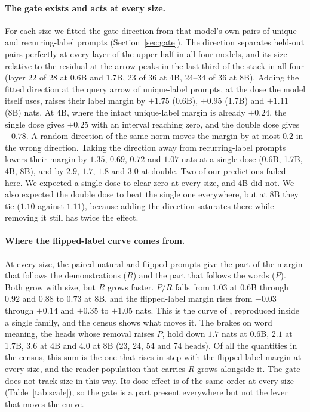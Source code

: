 \documentclass{article}
\begin{document}
\paragraph{The gate exists and acts at every size.} For each size we fitted the gate direction from that model's own pairs of unique- and recurring-label prompts (Section~\ref{sec:gate}). The direction separates held-out pairs perfectly at every layer of the upper half in all four models, and its size relative to the residual at the arrow peaks in the last third of the stack in all four (layer 22 of 28 at 0.6B and 1.7B, 23 of 36 at 4B, 24--34 of 36 at 8B). Adding the fitted direction at the query arrow of unique-label prompts, at the dose the model itself uses, raises their label margin by $+1.75$ (0.6B), $+0.95$ (1.7B) and $+1.11$ (8B) nats. At 4B, where the intact unique-label margin is already $+0.24$, the single dose gives $+0.25$ with an interval reaching zero, and the double dose gives $+0.78$. A random direction of the same norm moves the margin by at most $0.2$ in the wrong direction. Taking the direction away from recurring-label prompts lowers their margin by $1.35$, $0.69$, $0.72$ and $1.07$ nats at a single dose (0.6B, 1.7B, 4B, 8B), and by $2.9$, $1.7$, $1.8$ and $3.0$ at double. Two of our predictions failed here. We expected a single dose to clear zero at every size, and 4B did not. We also expected the double dose to beat the single one everywhere, but at 8B they tie ($1.10$ against $1.11$), because adding the direction saturates there while removing it still has twice the effect.

\paragraph{Where the flipped-label curve comes from.} At every size, the paired natural and flipped prompts give the part of the margin that follows the demonstrations ($R$) and the part that follows the words ($P$). Both grow with size, but $R$ grows faster. $P/R$ falls from $1.03$ at 0.6B through $0.92$ and $0.88$ to $0.73$ at 8B, and the flipped-label margin rises from $-0.03$ through $+0.14$ and $+0.35$ to $+1.05$ nats. This is the curve of \citet{wei2023larger}, reproduced inside a single family, and the census shows what moves it. The brakes on word meaning, the heads whose removal raises $P$, hold down $1.7$ nats at 0.6B, $2.1$ at 1.7B, $3.6$ at 4B and $4.0$ at 8B (23, 24, 54 and 74 heads). Of all the quantities in the census, this sum is the one that rises in step with the flipped-label margin at every size, and the reader population that carries $R$ grows alongside it. The gate does not track size in this way. Its dose effect is of the same order at every size (Table~\ref{tab:scale}), so the gate is a part present everywhere but not the lever that moves the curve.
\end{document}
